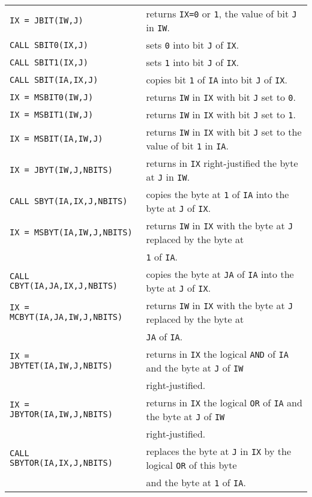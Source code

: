 \begin{tabular}{@{\hspace*{3mm}}ll}
{\tt IX = JBIT(IW,J)}
& returns \texttt{IX=0} or \texttt{1}, the value of bit {\tt J} in
{\tt IW}.\\
{\tt CALL SBIT0(IX,J)}
& sets {\tt 0} into bit {\tt J} of {\tt IX}.\\
{\tt CALL SBIT1(IX,J)}
& sets {\tt 1} into bit {\tt J} of {\tt IX}.\\
{\tt CALL SBIT(IA,IX,J)}
& copies bit {\tt 1} of {\tt IA} into bit {\tt J} of {\tt IX}.\\
{\tt IX = MSBIT0(IW,J)}
& returns {\tt IW} in {\tt IX} with bit {\tt J} set to {\tt 0}.\\
{\tt IX = MSBIT1(IW,J)}
& returns {\tt IW} in {\tt IX} with bit {\tt J} set to {\tt 1}.\\
{\tt IX = MSBIT(IA,IW,J)}
& returns {\tt IW} in {\tt IX} with bit {\tt J} set to the value of bit
{\tt 1} in {\tt IA}. \\
{\tt IX = JBYT(IW,J,NBITS)}
& returns in {\tt IX} right-justified the byte at {\tt J} in {\tt IW}.\\
{\tt CALL SBYT(IA,IX,J,NBITS)}
& copies the byte at {\tt 1} of {\tt IA} into the byte at {\tt J} of
{\tt IX}. \\
{\tt IX = MSBYT(IA,IW,J,NBITS)}
& returns {\tt IW} in {\tt IX} with the byte at {\tt J} replaced by the
byte at \\
& {\tt 1} of {\tt IA}. \\
{\tt CALL CBYT(IA,JA,IX,J,NBITS)}
& copies the byte at {\tt JA} of {\tt IA} into the byte at {\tt J} of
{\tt IX}. \\
{\tt IX = MCBYT(IA,JA,IW,J,NBITS)}
& returns {\tt IW} in {\tt IX} with the byte at {\tt J} replaced by the
byte at \\
& {\tt JA} of {\tt IA}. \\
{\tt IX = JBYTET(IA,IW,J,NBITS)}
& returns in {\tt IX} the logical {\tt AND} of {\tt IA} and the byte at
{\tt J} of {\tt IW} \\
& right-justified. \\
{\tt IX = JBYTOR(IA,IW,J,NBITS)}
& returns in {\tt IX} the logical {\tt OR} of {\tt IA} and the byte at
{\tt J} of {\tt IW} \\
& right-justified. \\
{\tt CALL SBYTOR(IA,IX,J,NBITS)}
& replaces the byte at {\tt J} in {\tt IX} by the logical {\tt OR} of
this byte \\
& and the byte at {\tt 1} of {\tt IA}. \\

\end{tabular}
